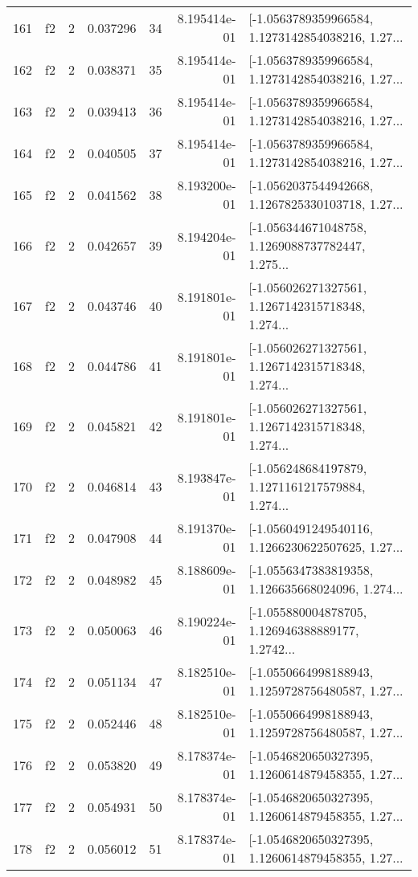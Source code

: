 \begin{tabular}{lllrlrl}
161 &  f2 &   2 &  0.037296 &   34 &  8.195414e-01 &  [-1.0563789359966584, 1.1273142854038216, 1.27... \\
162 &  f2 &   2 &  0.038371 &   35 &  8.195414e-01 &  [-1.0563789359966584, 1.1273142854038216, 1.27... \\
163 &  f2 &   2 &  0.039413 &   36 &  8.195414e-01 &  [-1.0563789359966584, 1.1273142854038216, 1.27... \\
164 &  f2 &   2 &  0.040505 &   37 &  8.195414e-01 &  [-1.0563789359966584, 1.1273142854038216, 1.27... \\
165 &  f2 &   2 &  0.041562 &   38 &  8.193200e-01 &  [-1.0562037544942668, 1.1267825330103718, 1.27... \\
166 &  f2 &   2 &  0.042657 &   39 &  8.194204e-01 &  [-1.056344671048758, 1.1269088737782447, 1.275... \\
167 &  f2 &   2 &  0.043746 &   40 &  8.191801e-01 &  [-1.056026271327561, 1.1267142315718348, 1.274... \\
168 &  f2 &   2 &  0.044786 &   41 &  8.191801e-01 &  [-1.056026271327561, 1.1267142315718348, 1.274... \\
169 &  f2 &   2 &  0.045821 &   42 &  8.191801e-01 &  [-1.056026271327561, 1.1267142315718348, 1.274... \\
170 &  f2 &   2 &  0.046814 &   43 &  8.193847e-01 &  [-1.056248684197879, 1.1271161217579884, 1.274... \\
171 &  f2 &   2 &  0.047908 &   44 &  8.191370e-01 &  [-1.0560491249540116, 1.1266230622507625, 1.27... \\
172 &  f2 &   2 &  0.048982 &   45 &  8.188609e-01 &  [-1.0556347383819358, 1.126635668024096, 1.274... \\
173 &  f2 &   2 &  0.050063 &   46 &  8.190224e-01 &  [-1.055880004878705, 1.126946388889177, 1.2742... \\
174 &  f2 &   2 &  0.051134 &   47 &  8.182510e-01 &  [-1.0550664998188943, 1.1259728756480587, 1.27... \\
175 &  f2 &   2 &  0.052446 &   48 &  8.182510e-01 &  [-1.0550664998188943, 1.1259728756480587, 1.27... \\
176 &  f2 &   2 &  0.053820 &   49 &  8.178374e-01 &  [-1.0546820650327395, 1.1260614879458355, 1.27... \\
177 &  f2 &   2 &  0.054931 &   50 &  8.178374e-01 &  [-1.0546820650327395, 1.1260614879458355, 1.27... \\
178 &  f2 &   2 &  0.056012 &   51 &  8.178374e-01 &  [-1.0546820650327395, 1.1260614879458355, 1.27... \\

\end{tabular}
